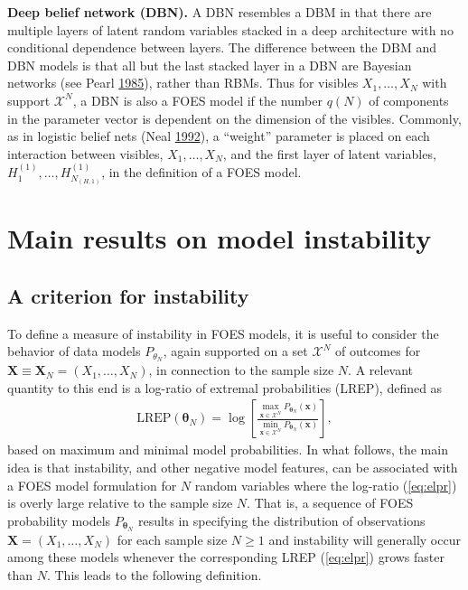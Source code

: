 \documentclass[12pt]{article}
\theoremstyle{definition}
\newcommand{\REP}{\mathrm{LREP}}
\begin{document}
\noindent \textbf{Deep belief network (DBN).} A DBN resembles a DBM in that there
are multiple layers of latent random variables stacked in a deep
architecture with no conditional dependence between layers. The
difference between the DBM and DBN models is that all but the last
stacked layer in a DBN are Bayesian networks (see Pearl
\protect\hyperlink{ref-pearl985bayesian}{1985}), rather than RBMs. Thus
for visibles \(X_1, \dots, X_N\) with support \(\mathcal{X}^N\), a DBN
is also a FOES model if the number \(q(N)\) of components in the
parameter vector is dependent on the dimension of the visibles.
Commonly, as in logistic belief nets (Neal
\protect\hyperlink{ref-neal1992connectionist}{1992}), a ``weight''
parameter is placed on each interaction between visibles,
\(X_1, \dots, X_N\), and the first layer of latent variables,
\(H^{(1)}_1, \dots, H^{(1)}_{N_{(H,1)}}\), in the definition of a FOES
model.

\section{Main results on model instability}\label{instability-results}

\subsection{A criterion for instability}
\label{criterion}
To define a measure of instability in FOES models, it is useful to consider the behavior of  data  models $P_{\theta_N}$, again supported on a set $\mathcal{X}^N$ of outcomes for $\boldsymbol X\equiv \boldsymbol X_N =(X_1,\ldots,X_N)$,  in connection to the sample size $N$.  A relevant quantity to this end is a log-ratio of extremal probabilities (LREP), defined as
\begin{align}
\label{eq:elpr}
 \REP (\boldsymbol \theta_N)  =  \log \left[\frac{\max\limits_{  \boldsymbol x\in \mathcal{X}^N}P_{\boldsymbol \theta_N}( \boldsymbol x)}{\min\limits_{ \boldsymbol x \in \mathcal{X}^N}P_{\boldsymbol \theta_N}( \boldsymbol x)}\right],
\end{align}
based on maximum and minimal model probabilities.
In what follows, the main idea is that instability, and other negative model features, can be associated with a FOES model formulation
for $N$ random variables where the log-ratio (\ref{eq:elpr}) is overly large relative to the sample size $N$.  That is,  a   sequence of FOES probability models $P_{\boldsymbol \theta_N}$  results
in specifying the distribution of observations $\boldsymbol X=(X_1,\ldots,X_N)$ for each sample size $N \geq 1$
 and instability will generally occur among these models whenever   the corresponding LREP (\ref{eq:elpr}) grows faster than $N$.  This leads to the following definition.
\end{document}
